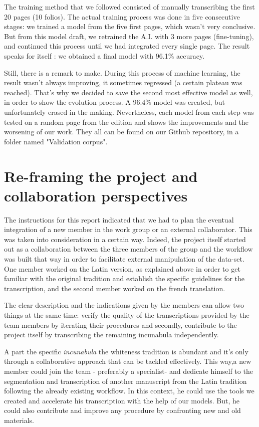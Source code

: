 \documentclass[12pt]{article}
\begin{document}
The training method that we followed consisted of manually transcribing the first 20 pages (10 folios). The actual training process was done in five consecutive stages: we trained a model from the five first pages, which wasn't very conclusive. But from this model draft, we retrained the A.I. with 3 more pages (fine-tuning), and continued this process until we had integrated every single page. The result speaks for itself : we obtained a final model with 96.1\% accuracy. 

Still, there is a remark to make. During this process of machine learning, the result wasn't always improving, it sometimes regressed (a certain plateau was reached). That's why we decided to save the second most effective model as well, in order to show the evolution process. A 96.4\% model was created, but unfortunately erased in the making. Nevertheless, each model from each step was tested on a random page from the edition and shows the improvements and the worsening of our work. They all can be found on our Github repository, in a folder named "Validation corpus". 


\section{Re-framing the project and collaboration perspectives}

The instructions for this report indicated that we had to plan the eventual integration of a new member in the work group or an external collaborator. This was taken into consideration in a certain way. Indeed, the project itself started out as a collaboration between the three members of the group and the workflow was built that way in order to facilitate external manipulation of the data-set. One member worked on the Latin version, as explained above in order to get familiar with the original tradition and establish the specific guidelines for the transcription, and the second member worked on the french translation.

The clear description and the indications given by the members can allow two things at the same time: verify the quality of the transcriptions provided by the team members by iterating their procedures and secondly, contribute to the project itself by transcribing the remaining incunabula independently.

A part the specific \textit{incunabula} the whiteness tradition is abundant and it's only through a collaborative approach that can be tackled effectively. This way,a new member could join the team - preferably a specialist-  and dedicate himself to the segmentation and transcription of another manuscript from the Latin tradition following the already existing workflow. In this context, he could use the tools we created and accelerate his transcription with the help of our models. But, he could also contribute and improve any procedure by confronting new and old materials.
\end{document}
